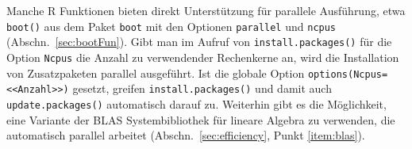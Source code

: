 \label{page:par_instpack}
Manche R Funktionen bieten direkt Unterstützung für parallele Ausführung, etwa \lstinline!boot()! aus dem Paket \lstinline!boot! mit den Optionen \lstinline!parallel! und \lstinline!ncpus! (Abschn.\ \ref{sec:bootFun}). Gibt man im Aufruf von \lstinline!install.packages()! für die Option \lstinline!Ncpus! die Anzahl zu verwendender Rechenkerne an, wird die Installation von Zusatzpaketen parallel ausgeführt. Ist die globale Option \lstinline!options(Ncpus=<<Anzahl>>)! gesetzt, greifen \lstinline!install.packages()! und damit auch \lstinline!update.packages()! automatisch darauf zu. Weiterhin gibt es die Möglichkeit, eine Variante der BLAS Systembibliothek für lineare Algebra zu verwenden, die automatisch parallel arbeitet (Abschn.\ \ref{sec:efficiency}, Punkt \ref{item:blas}).